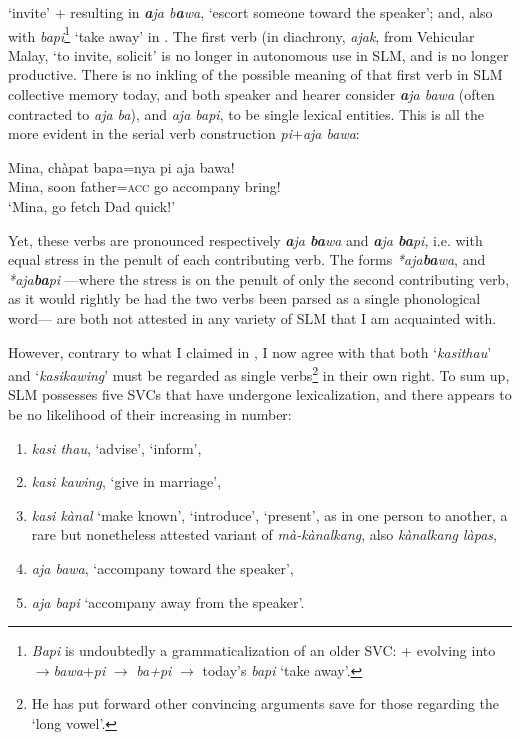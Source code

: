 `invite' +  resulting in 
\textit{\textbf{a}ja b\textbf{a}wa}, 
`escort someone toward the speaker'; 
and, also with 
\textit{bapi}\footnote{\textit{Bapi}
 is undoubtedly a grammaticalization of an older SVC:  +  evolving into $\rightarrow $\textit{bawa}+\textit{pi} $\rightarrow $ \textit{ba+pi} $\rightarrow $ today's \textit{bapi} `take away'.
} 
`take away' in 
. The first verb (in diachrony, \textit{ajak}, from Vehicular Malay, `to invite, solicit' is no longer in autonomous use in SLM, and is no longer productive. There is no inkling of the possible meaning of that first verb in SLM collective memory today, and both speaker and hearer consider  
\textit{\textbf{a}ja bawa} (often contracted to \textit{aja ba}), and \textit{aja bapi}, to be single lexical entities. This is all the more evident in the serial verb construction \textit{pi}+\textit{aja bawa}:

\ea\label{jaffar:ex:2}
\gll Mina, chàpat bapa=nya pi aja bawa! \\
Mina, soon father=\textsc{acc}  go accompany bring!\\
`Mina, go fetch Dad quick!'
\z

Yet, these verbs are pronounced respectively  
\textit{\textbf{a}ja \textbf{ba}wa} and
\textit{\textbf{a}ja \textbf{ba}pi}, i.e. with equal stress in the penult of each contributing verb. The forms \textit{*aja\textbf{ba}wa}, and \textit{*aja\textbf{ba}pi}  ---where the stress is on the penult of only the second contributing verb, as it would rightly be had the two verbs been parsed as a single phonological word--- are both not attested in any variety of SLM that I am acquainted with. 

However, contrary to what I claimed in \citet{BourdinEtAl2010}, I now agree with \citet{Nordhoff2009} that both `\textit{kasithau}' and `\textit{kasikawing}' must be regarded as single verbs\footnote{He
 has put forward other convincing arguments save for those regarding the `long vowel'.
}
in their own right. To sum up, SLM possesses five SVCs that have undergone lexicalization, and there appears to be no likelihood of their increasing in number:

\begin{enumerate}
\item \textit{kasi thau}, `advise', `inform',
\item \textit{kasi kawing}, `give in marriage',
\item \textit{kasi kànal} `make known', `introduce', `present', as in one person to another, a rare but nonetheless attested variant of \textit{mà-kànalkang}, also \textit{kànalkang làpas},
\item \textit{aja bawa}, `accompany toward the speaker',
\item \textit{aja bapi} `accompany away from the speaker'.
\end{enumerate}

